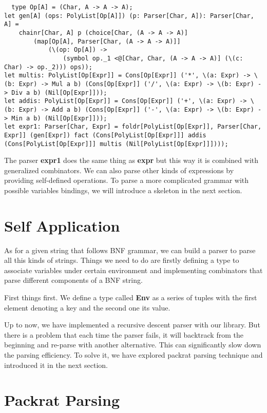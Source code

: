 \begin{lstlisting}
  type Op[A] = (Char, A -> A -> A);
let gen[A] (ops: PolyList[Op[A]]) (p: Parser[Char, A]): Parser[Char, A] =
	chainr[Char, A] p (choice[Char, (A -> A -> A)] 
		(map[Op[A], Parser[Char, (A -> A -> A)]] 
			(\(op: Op[A]) -> 
				(symbol op._1 <@[Char, Char, (A -> A -> A)] (\(c: Char) -> op._2))) ops));
let multis: PolyList[Op[Expr]] = Cons[Op[Expr]] ('*', \(a: Expr) -> \(b: Expr) -> Mul a b) (Cons[Op[Expr]] ('/', \(a: Expr) -> \(b: Expr) -> Div a b) (Nil[Op[Expr]]));
let addis: PolyList[Op[Expr]] = Cons[Op[Expr]] ('+', \(a: Expr) -> \(b: Expr) -> Add a b) (Cons[Op[Expr]] ('-', \(a: Expr) -> \(b: Expr) -> Min a b) (Nil[Op[Expr]]));
let expr1: Parser[Char, Expr] = foldr[PolyList[Op[Expr]], Parser[Char, Expr]] (gen[Expr]) fact (Cons[PolyList[Op[Expr]]] addis (Cons[PolyList[Op[Expr]]] multis (Nil[PolyList[Op[Expr]]])));
\end{lstlisting}
The parser \textbf{expr1} does the same thing as \textbf{expr} but this way it is combined with generalized combinators. We can also parse other kinds of expressions by providing self-defined operations. To parse a more complicated grammar with possible variables bindings, we will introduce a skeleton in the next section.

\section{Self Application}
As for a given string that follows BNF grammar, we can build a parser to parse all this kinds of strings. Things we need to do are firstly defining a type to associate variables under certain environment and implementing combinators that parse different components of a BNF string.

First things first. We define a type called \textbf{Env} as a series of tuples with the first element denoting a key and the second one its value. 

Up to now, we have implemented a recursive descent parser with our library. But there is a problem that each time the parser fails, it will backtrack from the beginning and re-parse with another alternative. This can significantly slow down the parsing efficiency. To solve it, we have explored packrat parsing technique and introduced it in the next section.

\section{Packrat Parsing}
